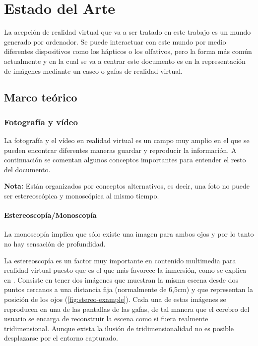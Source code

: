 
\pagestyle{empty}
\chapter {Estado del Arte}

La acepción de realidad virtual que va a ser tratado en este trabajo es un mundo generado por ordenador. Se puede interactuar con este mundo por medio diferentes dispositivos como los hápticos o los olfativos, pero la forma más común actualmente y en la cual se va a centrar este documento es en la representación de imágenes mediante un casco o gafas de realidad virtual.

\section{Marco teórico}

\subsection{Fotografía y vídeo}
La fotografía y el vídeo en realidad virtual es un campo muy amplio en el que se pueden encontrar diferentes maneras guardar y reproducir la información. A continuación se comentan algunos conceptos importantes para entender el resto del documento. 

\textbf{Nota:} Están organizados por conceptos alternativos, es decir, una foto no puede ser estereoscópica y monoscópica al mismo tiempo.

\subsubsection{Estereoscopía/Monoscopía}
La monoscopía implica que sólo existe una imagen para ambos ojos y por lo tanto no hay sensación de profundidad.

La estereoscopía es un factor muy importante en contenido multimedia para realidad virtual puesto que es el que más favorece la inmersión, como se explica en \cite{DiegoBezStereoscopy}. Consiste en tener dos imágenes que muestran la misma escena desde dos puntos cercanos a una distancia fija (normalmente de 6,5cm) y que representan la posición de los ojos (\ref{fig:stereo-example}). Cada una de estas imágenes se reproducen en una de las pantallas de las gafas, de tal manera que el cerebro del usuario se encarga de reconstruir la escena como si fuera realmente tridimensional. Aunque exista la ilusión de tridimensionalidad no es posible desplazarse por el entorno capturado.

